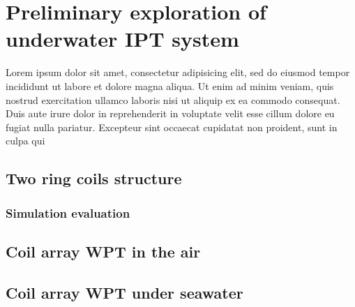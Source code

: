 \chapter{Preliminary exploration of underwater IPT system}
 Lorem ipsum dolor sit amet, consectetur adipisicing elit,
 sed do eiusmod tempor incididunt ut labore et dolore magna aliqua.
 Ut enim ad minim veniam, quis nostrud exercitation ullamco laboris nisi ut aliquip ex ea commodo consequat.
 Duis aute irure dolor in reprehenderit in voluptate velit esse cillum dolore eu fugiat nulla pariatur.
 Excepteur sint occaecat cupidatat non proident, sunt in culpa qui
 \section{Two ring coils structure}
 \subsection{Simulation evaluation}
 \section{Coil array WPT in the air}

 \section{Coil array WPT under seawater}